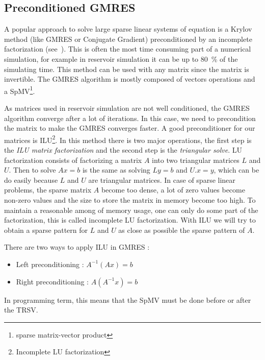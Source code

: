 \subsection{Preconditioned GMRES}
A popular approach to solve large sparse linear systems of equation is a Krylov method (like GMRES or Conjugate Gradient) preconditioned by an incomplete factorization (see~\cite{Saad96IMSLS}).
%
This is often the most time consuming part of a numerical simulation, for example in reservoir simulation it can be up to 80~\% of the simulating time.
%
This method can be used with any matrix since the matrix is invertible.
%
The GMRES algorithm is mostly composed of vectors operations and a SpMV\footnote{sparse matrix-vector product}.

As matrices used in reservoir simulation are not well conditioned, the GMRES algorithm converge after a lot of iterations.
%
In this case, we need to precondition the matrix to make the GMRES converges faster.
%
A good preconditioner for our matrices is ILU\footnote{Incomplete LU factorization}.
%
In this method there is two major operations, the first step is the {\em ILU matrix factorization} and the second step is the {\em triangular solve}.
%
LU factorization consists of factorizing a matrix $A$ into two triangular matrices $L$ and $U$.
%
Then to solve $Ax=b$ is the same as solving $Ly=b$ and $U.x=y$, which can be do easily because $L$ and $U$ are triangular matrices.
%
In case of sparse linear problems, the sparse matrix $A$ become too dense, a lot of zero values become non-zero values and the size to store the matrix in memory become too high.
%
To maintain a reasonable among of memory usage, one can only do some part of the factorization, this is called incomplete LU factorization.
%
With ILU we will try to obtain a sparse pattern for $L$ and $U$ as close as possible the sparse pattern of $A$.

There are two ways to apply ILU in GMRES :
\begin{itemize}
  \item Left preconditioning : $A^{-1}(Ax)=b$
  \item Right preconditioning : $A(A^{-1}x)=b$
\end{itemize}

In programming term, this means that the SpMV must be done before or after the TRSV.
